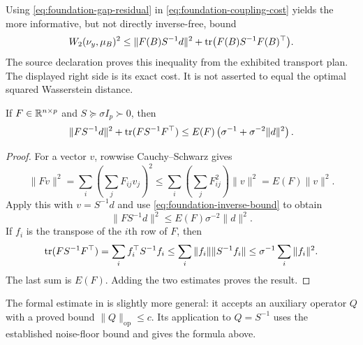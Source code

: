Using \eqref{eq:foundation-gap-residual} in \eqref{eq:foundation-coupling-cost} yields the more informative, but not directly inverse-free, bound
\begin{equation}
 W_2(\nu_y,\mu_B)^2
 \le\|F(B)S^{-1}d\|^2
       +\operatorname{tr}\bigl(F(B)S^{-1}F(B)^\top\bigr).
 \label{eq:foundation-residual-exact-cost}
\end{equation}
The source declaration  proves this inequality from the exhibited transport plan. The displayed right side is its exact cost. It is not asserted to equal the optimal squared Wasserstein distance.

\begin{lemma}
\label{lem:foundation-energy-majorant}
If $F\in\mathbb R^{n\times p}$ and $S\succeq\sigma I_p\succ0$, then
\begin{equation}
 \|FS^{-1}d\|^2+\operatorname{tr}(FS^{-1}F^\top)
 \le E(F)\left(\sigma^{-1}+\sigma^{-2}\|d\|^2\right).
 \label{eq:foundation-cost-majorant}
\end{equation}
\end{lemma}
\begin{proof}
For a vector $v$, rowwise Cauchy--Schwarz gives
\[
 \|Fv\|^2=\sum_i\left(\sum_jF_{ij}v_j\right)^2
 \le\sum_i\left(\sum_jF_{ij}^2\right)\|v\|^2
 =E(F)\|v\|^2.
\]
Apply this with $v=S^{-1}d$ and use \eqref{eq:foundation-inverse-bound} to obtain
\[
 \|FS^{-1}d\|^2\le E(F)\sigma^{-2}\|d\|^2.
\]
If $f_i$ is the transpose of the $i$th row of $F$, then
\[
 \operatorname{tr}(FS^{-1}F^\top)=\sum_i f_i^\top S^{-1}f_i
 \le\sum_i\|f_i\|\|S^{-1}f_i\|
 \le\sigma^{-1}\sum_i\|f_i\|^2.
\]
The last sum is $E(F)$. Adding the two estimates proves the result.
\end{proof}

The formal estimate  in  is slightly more general: it accepts an auxiliary operator $Q$ with a proved bound $\|Q\|_{\mathrm{op}}\le c$. Its application to $Q=S^{-1}$ uses the established noise-floor bound and gives the formula above.

